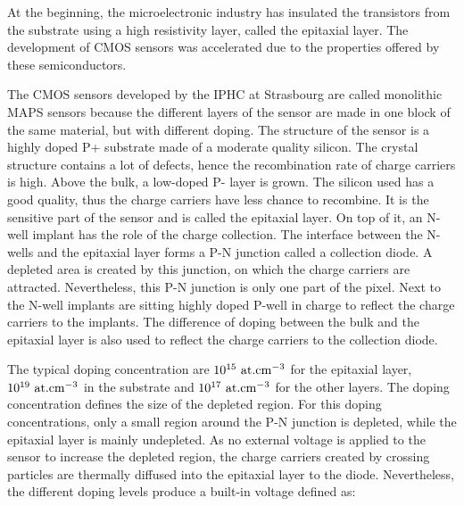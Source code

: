     At the beginning, the microelectronic industry has insulated the transistors from the substrate using a high resistivity layer, called the epitaxial layer.
    The development of \gls{CMOS} sensors was accelerated due to the properties offered by these semiconductors.
    
    
    The \gls{CMOS} sensors developed by the IPHC at Strasbourg are called monolithic \gls{MAPS} sensors because the different layers of the sensor are made in one block of the same material, but with different doping.
    The structure of the sensor is a highly doped P+ substrate made of a moderate quality silicon. 
    The crystal structure contains a lot of defects, hence the recombination rate of charge carriers is high.
    Above the bulk, a low-doped P- layer is grown.
    The silicon used has a good quality, thus the charge carriers have less chance to recombine.
    It is the sensitive part of the sensor and is called the epitaxial layer. 
    On top of it, an N-well implant has the role of the charge collection.
    The interface between the N-wells and the epitaxial layer forms a P-N junction called a collection diode.
    A depleted area is created by this junction, on which the charge carriers are attracted.
    Nevertheless, this P-N junction is only one part of the pixel.
    Next to the N-well implants are sitting highly doped P-well in charge to reflect the charge carriers to the implants.
    The difference of doping between the bulk and the epitaxial layer is also used to reflect the charge carriers to the collection diode.

    The typical doping concentration are $10^{15}~\rm{at.cm}^{-3}$ for the epitaxial layer, $10^{19}~\rm{at.cm}^{-3}$ in the substrate and $10^{17}~\rm{at.cm}^{-3}$ for the other layers.
    The doping concentration defines the size of the depleted region.
    For this doping concentrations, only a small region around the P-N junction is depleted, while the epitaxial layer is mainly undepleted. 
    As no external voltage is applied to the sensor to increase the depleted region, the charge carriers created by crossing particles are thermally diffused into the epitaxial layer to the diode.
    Nevertheless, the different doping levels produce a built-in voltage defined as: 

